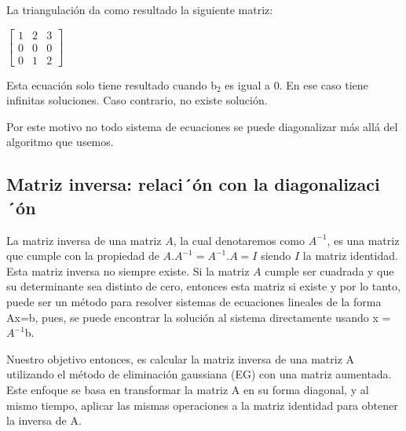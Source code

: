 La triangulación da como resultado la siguiente matriz:

\begin{center}
$\begin{bmatrix}
1 & 2 & 3\\
0 & 0 & 0\\
0 & 1 & 2
\end{bmatrix}$
\end{center}

Esta ecuación solo tiene resultado cuando b$_2$ es igual a 0. En ese caso tiene infinitas soluciones. Caso contrario, no existe solución.

Por este motivo no todo sistema de ecuaciones se puede diagonalizar más allá  del algoritmo que usemos.

\subsection{Matriz inversa: relaci´ón con la diagonalizaci´ón}
\label{opcionales}
\label{sec:inversa}

La matriz inversa de una matriz $A$, la cual denotaremos como $A^{-1}$, es una matriz que cumple con la propiedad de $A.A^{-1}=A^{-1}.A=I$ siendo $I$ la matriz identidad. Esta matriz inversa no siempre existe. Si la matriz $A$ cumple ser cuadrada y que su determinante \cite{Strang-determinante} sea distinto de cero, entonces esta matriz si existe y por lo tanto, puede ser un método para resolver sistemas de ecuaciones lineales de la forma Ax=b, pues, se puede encontrar la solución al sistema directamente usando  x = $A^{-1}$b.

Nuestro objetivo entonces, es calcular la matriz inversa de una matriz A utilizando el método de eliminación gaussiana (EG) con una matriz aumentada. Este enfoque se basa en transformar la matriz A en su forma diagonal, y al mismo tiempo, aplicar las mismas operaciones a la matriz identidad para obtener la inversa de A.

